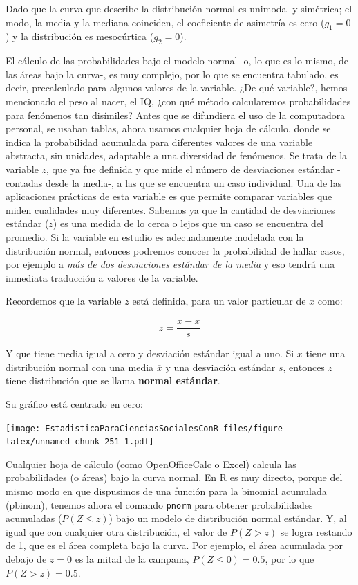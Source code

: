 \documentclass[]{book}
\begin{document}
Dado que la curva que describe la distribución normal es unimodal y
simétrica; el modo, la media y la mediana coinciden, el coeficiente de
asimetría es cero (\(g_{1}=0\)) y la distribución es mesocúrtica (\(g_{2}=0\)).

El cálculo de las probabilidades bajo el modelo normal -o, lo que es lo
mismo, de las áreas bajo la curva-, es muy complejo, por lo que se
encuentra tabulado, es decir, precalculado para algunos valores de la
variable. ¿De qué variable?, hemos mencionado el peso al nacer, el IQ,
¿con qué método calcularemos probabilidades para fenómenos tan
disímiles? Antes que se difundiera el uso de la computadora personal, se
usaban tablas, ahora usamos cualquier hoja de cálculo, donde se indica
la probabilidad acumulada para diferentes valores de una variable
abstracta, sin unidades, adaptable a una diversidad de fenómenos. Se
trata de la variable \(z\), que ya fue definida y que mide el número de
desviaciones estándar -contadas desde la media-, a las que se encuentra
un caso individual. Una de las aplicaciones prácticas de esta variable
es que permite comparar variables que miden cualidades muy diferentes.
Sabemos ya que la cantidad de desviaciones estándar (\(z\)) es una medida
de lo cerca o lejos que un caso se encuentra del promedio. Si la
variable en estudio es adecuadamente modelada con la distribución
normal, entonces podremos conocer la probabilidad de hallar casos, por
ejemplo a \emph{más de dos desviaciones estándar de la media} y eso tendrá
una inmediata traducción a valores de la variable.

Recordemos que la variable \(z\) está definida, para un valor particular
de \(x\) como:

\[z = \frac{x - \overline{x}}{s}\]

Y que tiene media igual a cero y desviación estándar igual a uno. Si \(x\)
tiene una distribución normal con una media \(\overline{x}\) y una
desviación estándar \(s\), entonces \(z\) tiene distribución que se llama
\textbf{normal estándar}.

Su gráfico está centrado en cero:

\texttt{[image: EstadisticaParaCienciasSocialesConR\_files/figure-latex/unnamed-chunk-251-1.pdf]}

Cualquier hoja de cálculo (como OpenOfficeCalc o Excel)
calcula las probabilidades (o áreas) bajo la curva normal. En R es muy directo, porque del mismo modo en que dispusimos de una función para la binomial acumulada (pbinom), tenemos ahora el comando \texttt{pnorm} para obtener probabilidades acumuladas (\(P(Z\leq z)\)) bajo un modelo de distribución normal estándar. Y, al igual que con cualquier otra distribución, el valor de \(P(Z>z)\) se logra restando de 1, que es el área completa bajo la curva. Por ejemplo, el área acumulada por debajo de \(z=0\) es la mitad de la campana, \(P(Z\leq 0)=0.5\), por lo que \(P(Z>z)=0.5\).
\end{document}
